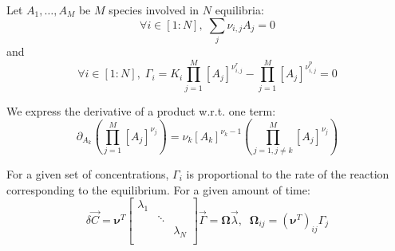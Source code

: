 \documentclass[aps,12pt]{revtex4}
\begin{document}
Let $A_1,\ldots,A_M$ be $M$ species involved in $N$ equilibria:
\begin{equation}
	\forall i\in[1:N], \; \sum_j \nu_{i,j} A_j = 0
\end{equation}
and
\begin{equation}
	\forall i\in[1:N], \; 
	\Gamma_i = K_i \prod_{j=1}^{M} [A_j]^{\nu^r_{i,j}} 
	- \prod_{j=1}^{M} [A_j]^{\nu^p_{i,j}} = 0
\end{equation}

We express the derivative of a product w.r.t. one term:
\begin{equation}
	\partial_{A_k} \left( \prod_{j=1}^{M} [A_j]^{\nu_{j}} \right)  =
	\nu_k [A_k]^{\nu_k-1} \left( \prod_{j=1,j\not=k}^{M} [A_j]^{\nu_{j}} \right)
\end{equation}

For a given set of concentrations, $\Gamma_i$ is proportional
to the rate of the reaction corresponding to the equilibrium.
For a given amount of time:
\begin{equation}
	\delta \vec{C} = \bm{\nu}^T
	\begin{bmatrix}
	\lambda_1 & & \\
	 & \ddots & \\
	 & & \lambda_N \\
	\end{bmatrix}
	\vec{\Gamma}
	= \bm{\Omega} \vec{\lambda}, \;\; \bm{\Omega}_{ij} = \left(\bm{\nu}^T\right)_{ij} \Gamma_j
\end{equation}
\end{document}
